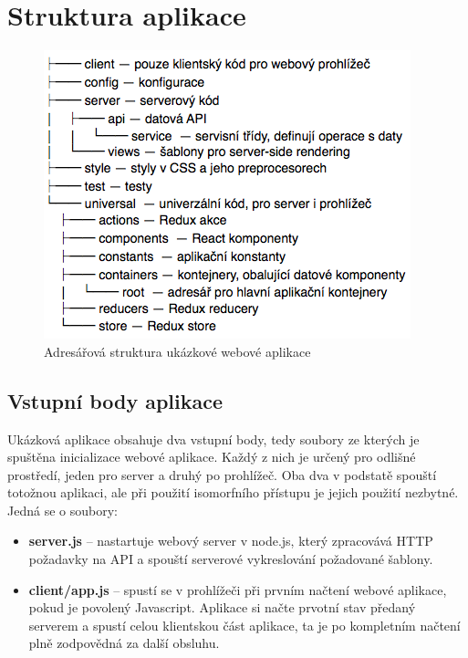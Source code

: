 \section{Struktura aplikace}  
\begin{figure}[h]
\begin{centering}
\includegraphics[scale=0.6]{obrazky/struktura}
\par\end{centering}
\caption{Adresářová struktura ukázkové webové aplikace \label{fig:structure}}
\end{figure}
\FloatBarrier
          
\subsection{Vstupní body aplikace}              
Ukázková aplikace obsahuje dva vstupní body, tedy soubory ze kterých je spuštěna inicializace webové aplikace. Každý z nich je určený pro odlišné prostředí, jeden pro server a druhý po prohlížeč. Oba dva v podstatě spouští totožnou aplikaci, ale při použití isomorfního přístupu je jejich použití nezbytné. Jedná se o soubory:
\begin{itemize}
\item \textbf{server.js} – nastartuje webový server v node.js, který zpracovává HTTP požadavky na API a spouští serverové vykreslování požadované šablony.
\item \textbf{client/app.js} – spustí se v prohlížeči při prvním načtení webové aplikace, pokud je povolený Javascript. Aplikace si načte prvotní stav předaný serverem a spustí celou klientskou část aplikace, ta je po kompletním načtení plně zodpovědná za další obsluhu.
\end{itemize} 

